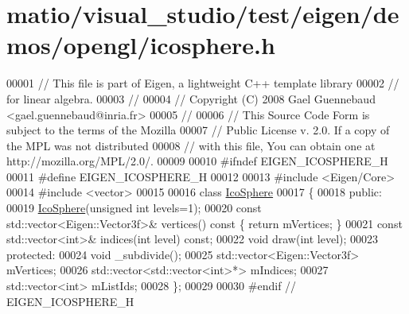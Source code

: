 \hypertarget{matio_2visual__studio_2test_2eigen_2demos_2opengl_2icosphere_8h_source}{}\section{matio/visual\+\_\+studio/test/eigen/demos/opengl/icosphere.h}
\label{matio_2visual__studio_2test_2eigen_2demos_2opengl_2icosphere_8h_source}

\begin{DoxyCode}
00001 \textcolor{comment}{// This file is part of Eigen, a lightweight C++ template library}
00002 \textcolor{comment}{// for linear algebra.}
00003 \textcolor{comment}{//}
00004 \textcolor{comment}{// Copyright (C) 2008 Gael Guennebaud <gael.guennebaud@inria.fr>}
00005 \textcolor{comment}{//}
00006 \textcolor{comment}{// This Source Code Form is subject to the terms of the Mozilla}
00007 \textcolor{comment}{// Public License v. 2.0. If a copy of the MPL was not distributed}
00008 \textcolor{comment}{// with this file, You can obtain one at http://mozilla.org/MPL/2.0/.}
00009 
00010 \textcolor{preprocessor}{#ifndef EIGEN\_ICOSPHERE\_H}
00011 \textcolor{preprocessor}{#define EIGEN\_ICOSPHERE\_H}
00012 
00013 \textcolor{preprocessor}{#include <Eigen/Core>}
00014 \textcolor{preprocessor}{#include <vector>}
00015 
00016 \textcolor{keyword}{class }\hyperlink{class_ico_sphere}{IcoSphere}
00017 \{
00018   \textcolor{keyword}{public}:
00019     \hyperlink{class_ico_sphere}{IcoSphere}(\textcolor{keywordtype}{unsigned} \textcolor{keywordtype}{int} levels=1);
00020     \textcolor{keyword}{const} std::vector<Eigen::Vector3f>& vertices()\textcolor{keyword}{ const }\{ \textcolor{keywordflow}{return} mVertices; \}
00021     \textcolor{keyword}{const} std::vector<int>& indices(\textcolor{keywordtype}{int} level) \textcolor{keyword}{const};
00022     \textcolor{keywordtype}{void} draw(\textcolor{keywordtype}{int} level);
00023   \textcolor{keyword}{protected}:
00024     \textcolor{keywordtype}{void} \_subdivide();
00025     std::vector<Eigen::Vector3f> mVertices;
00026     std::vector<std::vector<int>*> mIndices;
00027     std::vector<int> mListIds;
00028 \};
00029 
00030 \textcolor{preprocessor}{#endif // EIGEN\_ICOSPHERE\_H}
\end{DoxyCode}

